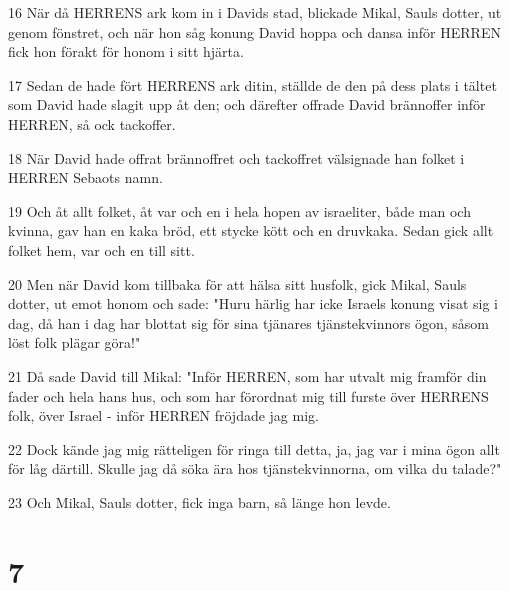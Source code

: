 \par 16 När då HERRENS ark kom in i Davids stad, blickade Mikal, Sauls dotter, ut genom fönstret, och när hon såg konung David hoppa och dansa inför HERREN fick hon förakt för honom i sitt hjärta.
\par 17 Sedan de hade fört HERRENS ark ditin, ställde de den på dess plats i tältet som David hade slagit upp åt den; och därefter offrade David brännoffer inför HERREN, så ock tackoffer.
\par 18 När David hade offrat brännoffret och tackoffret välsignade han folket i HERREN Sebaots namn.
\par 19 Och åt allt folket, åt var och en i hela hopen av israeliter, både man och kvinna, gav han en kaka bröd, ett stycke kött och en druvkaka. Sedan gick allt folket hem, var och en till sitt.
\par 20 Men när David kom tillbaka för att hälsa sitt husfolk, gick Mikal, Sauls dotter, ut emot honom och sade: "Huru härlig har icke Israels konung visat sig i dag, då han i dag har blottat sig för sina tjänares tjänstekvinnors ögon, såsom löst folk plägar göra!"
\par 21 Då sade David till Mikal: "Inför HERREN, som har utvalt mig framför din fader och hela hans hus, och som har förordnat mig till furste över HERRENS folk, över Israel - inför HERREN fröjdade jag mig.
\par 22 Dock kände jag mig rätteligen för ringa till detta, ja, jag var i mina ögon allt för låg därtill. Skulle jag då söka ära hos tjänstekvinnorna, om vilka du talade?"
\par 23 Och Mikal, Sauls dotter, fick inga barn, så länge hon levde.

\chapter{7}

